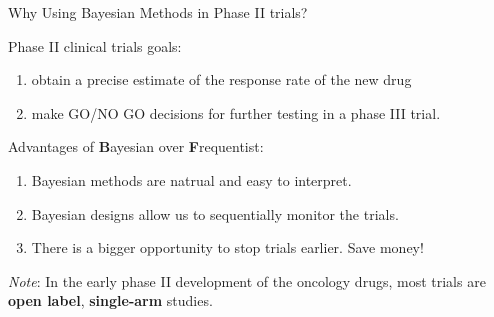 \begin{frame}{Why Using Bayesian Methods in Phase II trials?}

Phase II clinical trials goals:

\begin{enumerate}
\def\labelenumi{\arabic{enumi}.}
\tightlist
\item
  obtain a precise estimate of the response rate of the new drug
\item
  make GO/NO GO decisions for further testing in a phase III trial.
\end{enumerate}

Advantages of \textbf{B}ayesian over \textbf{F}requentist:

\begin{enumerate}
\def\labelenumi{\arabic{enumi}.}
\tightlist
\item
  Bayesian methods are natrual and easy to interpret.
\item
  Bayesian designs allow us to sequentially monitor the trials.
\item
  There is a bigger opportunity to stop trials earlier. Save money!
\end{enumerate}

\emph{Note}: In the early phase II development of the oncology drugs,
most trials are \textbf{open label}, \textbf{single-arm} studies.

\end{frame}

